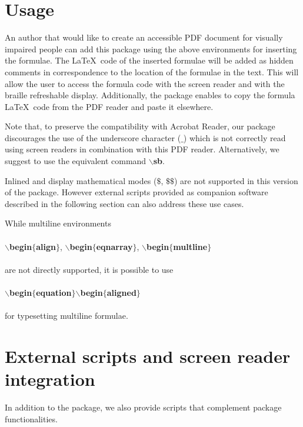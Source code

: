 \documentclass[11pt,a4paper]{article}
\begin{document}
\section{Usage}

\noindent An author that would like to create an accessible PDF document for visually impaired people can add this package using the above environments for inserting the formulae. The \LaTeX\ code of the inserted formulae will be added as hidden comments in correspondence to the location of the formulae in the text. This will allow the user to access the formula code with the screen reader and with the braille refreshable display. Additionally, the package enables to copy the formula \LaTeX\ code from the PDF reader and paste it elsewhere.

\noindent Note that, to preserve the compatibility with Acrobat Reader, our package discourages the use of the underscore character ($\_$) which is not correctly read using screen readers in combination with this PDF reader. Alternatively, we suggest to use the equivalent command $\backslash$\textbf{sb}.

\noindent Inlined and display mathematical modes ($\$$, $\$\$$) are not supported in this version of the package. However external scripts provided as companion software described in the following section can also address these use cases. 

\noindent While multiline environments \\ \\
\indent $\backslash$\textbf{begin}$\{$\textbf{align}$\}$, $\backslash$\textbf{begin}$\{$\textbf{eqnarray}$\}$, $\backslash$\textbf{begin}$\{$\textbf{multline}$\}$
\\ \\
are not directly supported, it is possible to use \\ \\
\indent $\backslash$\textbf{begin}$\{$\textbf{equation}$\}$$\backslash$\textbf{begin}$\{$\textbf{aligned}$\}$ 
\\ \\
for typesetting multiline formulae.

\section{External scripts and screen reader integration}

In addition to the package, we also provide scripts that complement package functionalities. 
\end{document}
